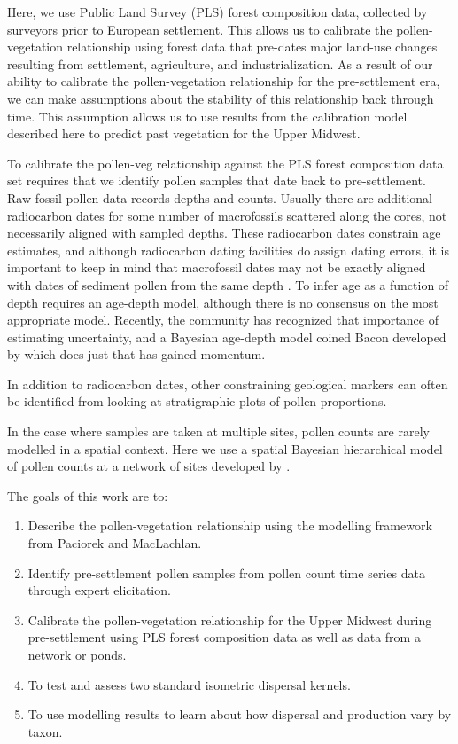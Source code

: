 \documentclass[12pt]{article}
\begin{document}
Here, we use Public Land Survey (PLS) forest composition data,
collected by surveyors prior to European settlement. This allows us to
calibrate the pollen-vegetation relationship using forest data that
pre-dates major land-use changes resulting from settlement,
agriculture, and industrialization. As a result of our ability to
calibrate the pollen-vegetation relationship for the pre-settlement
era, we can make assumptions about the stability of this relationship
back through time. This assumption allows us to use results from the
calibration model described here to predict past vegetation for the
Upper Midwest.

To calibrate the pollen-veg relationship against the PLS forest
composition data set requires that we identify pollen samples that
date back to pre-settlement. Raw fossil pollen data records depths and
counts. Usually there are additional radiocarbon dates for some number
of macrofossils scattered along the cores, not necessarily aligned
with sampled depths. These radiocarbon dates constrain age estimates,
and although radiocarbon dating facilities do assign dating errors, it
is important to keep in mind that macrofossil dates may not be exactly
aligned with dates of sediment pollen from the same depth
\cite{XXX}. To infer age as a function of depth requires an age-depth
model, although there is no consensus on the most appropriate
model. Recently, the community has recognized that importance of
estimating uncertainty, and a Bayesian age-depth model coined Bacon
developed by \cite{XXX }which does just that has gained momentum.
  
In addition to radiocarbon dates, other constraining geological
markers can often be identified from looking at stratigraphic plots of
pollen proportions.


In the case where samples are taken at multiple sites, pollen counts
are rarely modelled in a spatial context. Here we use a spatial
Bayesian hierarchical model of pollen counts at a network of sites
developed by \cite{XXX}.

The goals of this work are to:
\begin{enumerate}
\item Describe the pollen-vegetation relationship using the modelling framework from Paciorek and MacLachlan. 
\item Identify pre-settlement pollen samples from pollen count time series data through expert elicitation.
\item Calibrate the pollen-vegetation relationship for the Upper Midwest during pre-settlement using PLS forest composition data as well as data from a network or ponds. 
\item To test and assess two standard isometric dispersal kernels.
\item To use modelling results to learn about how dispersal and
  production vary by taxon.
\end{enumerate}
\end{document}
